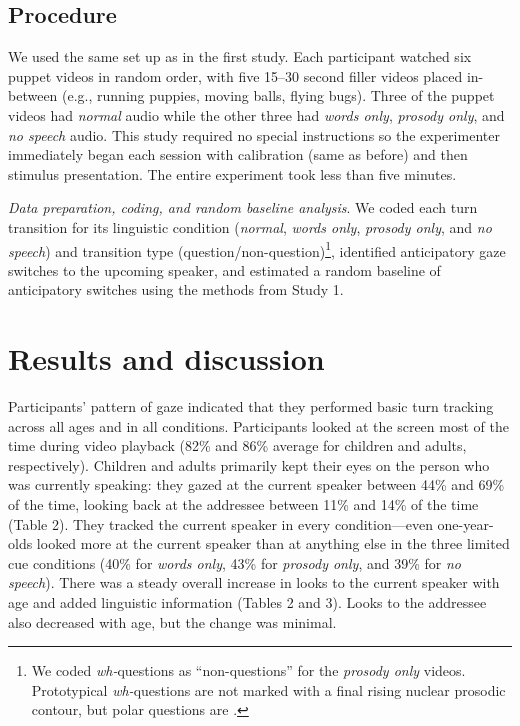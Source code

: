 \documentclass[authoryear, 12pt]{elsarticle}
\begin{document}
\subsection{Procedure}
We used the same set up as in the first study. Each participant watched six puppet videos in random order, with five 15--30 second filler videos placed in-between (e.g., running puppies, moving balls, flying bugs). Three of the puppet videos had \textit{normal} audio while the other three had \textit{words only}, \textit{prosody only}, and \textit{no speech} audio. This study required no special instructions so the experimenter immediately began each session with calibration (same as before) and then stimulus presentation. The entire experiment took less than five minutes.

\textit{Data preparation, coding, and random baseline analysis}. We coded each turn transition for its linguistic condition (\textit{normal}, \textit{words only}, \textit{prosody only}, and \textit{no speech}) and transition type (question/non-question)\footnote{We coded \textit{wh-}questions as ``non-questions'' for the \textit{prosody only} videos. Prototypical \textit{wh-}questions are not marked with a final rising nuclear prosodic contour, but polar questions are \citep{hedberg2010}.}, identified anticipatory gaze switches to the upcoming speaker, and estimated a random baseline of anticipatory switches using the methods from Study 1.

\section{Results and discussion}
\label{sec:results2}

Participants' pattern of gaze indicated that they performed basic turn tracking across all ages and in all conditions. Participants looked at the screen most of the time during video playback (82\% and 86\% average for children and adults, respectively). Children and adults primarily kept their eyes on the person who was currently speaking: they gazed at the current speaker between 44\% and 69\% of the time, looking back at the addressee between 11\% and 14\% of the time (Table 2). They tracked the current speaker in every condition---even one-year-olds looked more at the current speaker than at anything else in the three limited cue conditions (40\% for \textit{words only}, 43\% for \textit{prosody only}, and 39\% for \textit{no speech}). There was a steady overall increase in looks to the current speaker with age and added linguistic information (Tables 2 and 3). Looks to the addressee also decreased with age, but the change was minimal. 
\end{document}
